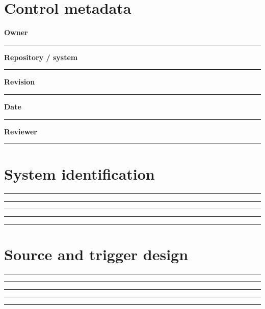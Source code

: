 \documentclass[11pt,letterpaper]{article}
\begin{document}
\makedoctitle\makedocsummary
\section{Control metadata}
\noindent\textbf{Owner}\par\nobreak\vspace{6pt}\noindent\rule{0.93\linewidth}{0.4pt}\par\vspace{14pt}
\noindent\textbf{Repository / system}\par\nobreak\vspace{6pt}\noindent\rule{0.93\linewidth}{0.4pt}\par\vspace{14pt}
\noindent\textbf{Revision}\par\nobreak\vspace{6pt}\noindent\rule{0.93\linewidth}{0.4pt}\par\vspace{14pt}
\noindent\textbf{Date}\par\nobreak\vspace{6pt}\noindent\rule{0.93\linewidth}{0.4pt}\par\vspace{14pt}
\noindent\textbf{Reviewer}\par\nobreak\vspace{6pt}\noindent\rule{0.93\linewidth}{0.4pt}\par\vspace{14pt}
\section{System identification}
\vspace{2mm}
\noindent\rule{0.93\linewidth}{0.4pt}\par\vspace{13pt}
\noindent\rule{0.93\linewidth}{0.4pt}\par\vspace{13pt}
\noindent\rule{0.93\linewidth}{0.4pt}\par\vspace{13pt}
\noindent\rule{0.93\linewidth}{0.4pt}\par\vspace{13pt}
\noindent\rule{0.93\linewidth}{0.4pt}\par\vspace{13pt}
\section{Source and trigger design}
\vspace{2mm}
\noindent\rule{0.93\linewidth}{0.4pt}\par\vspace{13pt}
\noindent\rule{0.93\linewidth}{0.4pt}\par\vspace{13pt}
\noindent\rule{0.93\linewidth}{0.4pt}\par\vspace{13pt}
\noindent\rule{0.93\linewidth}{0.4pt}\par\vspace{13pt}
\noindent\rule{0.93\linewidth}{0.4pt}\par\vspace{13pt}
\end{document}
